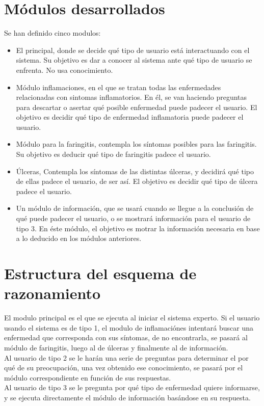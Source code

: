 \section{Módulos desarrollados}

Se han definido cinco modulos:
\begin{itemize}
  \item El principal, donde se decide qué tipo de usuario está interactuando con el sistema. Su objetivo es dar a conocer al sistema ante qué tipo de usuario se enfrenta. No usa conocimiento.
  \item Módulo inflamaciones, en el que se tratan todas las enfermedades relacionadas con sintomas inflamatorios. En él, se van haciendo preguntas para descartar o asertar qué posible enfermedad puede padecer el usuario. El objetivo es decidir qué tipo de enfermedad inflamatoria puede padecer el usuario.
  \item Módulo para la faringitis, contempla los síntomas posibles para las faringitis. Su objetivo es deducir qué tipo de faringitis padece el usuario.
  \item Úlceras, Contempla los síntomas de las distintas úlceras, y decidirá qué tipo de ellas padece el usuario, de ser así. El objetivo es decidir qué tipo de úlcera padece el usuario.
  \item Un módulo de información, que se usará cuando se llegue a la conclusión de qué puede padecer el usuario, o se mostrará información para el usuario de tipo 3. En éste módulo, el objetivo es motrar la información necesaria en base a lo deducido en los módulos anteriores.
\end{itemize}

\section{Estructura del esquema de razonamiento}

El modulo principal es el que se ejecuta al iniciar el sistema experto. Si el usuario usando el sistema es de tipo 1, el modulo de inflamaciónes intentará buscar una enfermedad que corresponda con sus síntomas, de no encontrarla, se pasará al módulo de faringitis, luego al de úlceras y finalmente al de información.\\
Al usuario de tipo 2 se le harán una serie de preguntas para determinar el por qué de su preocupación, una vez obtenido ese conocimiento, se pasará por el módulo correspondiente en función de sus respuestas.\\
Al usuario de tipo 3 se le pregunta por qué tipo de enfermedad quiere informarse, y se ejecuta directamente el módulo de información basándose en su respuesta.

